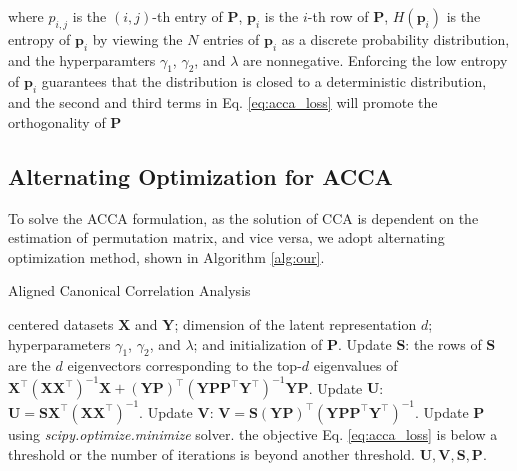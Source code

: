  where $p_{i,j}$ is the $(i,j)$-th entry of $\mathbf{P}$, $\mathbf{p}_i$ is the $i$-th row of $\mathbf{P}$, $H(\mathbf{p}_i)$ is the entropy of $\mathbf{p}_i$ by viewing the $N$ entries of $\mathbf{p}_i$ as a discrete probability distribution, and the hyperparamters $\gamma_1$, $\gamma_2$, and $\lambda$ are nonnegative. Enforcing the low entropy of $\mathbf{p}_i$ guarantees that the distribution is closed to a deterministic distribution, and the second and third terms in Eq. \eqref{eq:acca_loss} will promote the orthogonality of $\mathbf{P}$


\subsection{Alternating Optimization for ACCA}
To solve the ACCA formulation, as the solution of CCA is dependent on the estimation of permutation matrix, and vice versa, we  adopt alternating optimization method, shown in Algorithm \ref{alg:our}. 


\begin{algorithm}[t]
	\caption{Aligned Canonical Correlation Analysis}
	\label{alg:our}
	\begin{algorithmic}[1]
		centered datasets $\mathbf{X}$ and $\mathbf{Y}$; dimension of the latent representation $d$; hyperparameters $\gamma_1$, $\gamma_2$, and $\lambda$;  and initialization of $\mathbf{P}$.
		\label{step:4} \newline  
		Update $\mathbf{S}$: the rows of $\mathbf{S}$ are the $d$ eigenvectors corresponding to the top-$d$ eigenvalues of $\mathbf{X}^\top(\mathbf{X}\mathbf{X}^\top)^{-1}\mathbf{X}+(\mathbf{YP})^\top(\mathbf{YP}\mathbf{P}^\top\mathbf{Y}^\top)^{-1}\mathbf{YP}$.
		 \newline  
		Update $\mathbf{U}$: $\mathbf{U} = \mathbf{S}\mathbf{X}^\top
(\mathbf{X}\mathbf{X}^\top)^{-1}$.
		 \newline  
		Update $\mathbf{V}$: $\mathbf{V} =\mathbf{S}(\mathbf{YP})^\top(\mathbf{YP}\mathbf{P}^\top\mathbf{Y}^\top)^{-1}$.
  \newline  
		Update $\mathbf{P}$ using \emph{scipy.optimize.minimize} solver.
		 the objective Eq. \eqref{eq:acca_loss} is below a threshold or the number of iterations is beyond another threshold. 
		  $\mathbf{U, V, S, P}$.
	\end{algorithmic}
\end{algorithm} 
